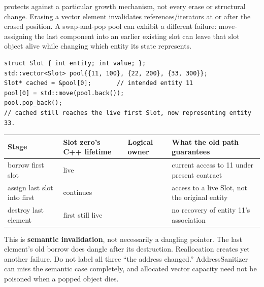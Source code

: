  protects against a particular growth mechanism, not every erase or structural change. Erasing a vector element invalidates references/iterators at or after the erased position. A swap-and-pop pool can exhibit a different failure: move-assigning the last component into an earlier existing slot can leave that slot object alive while changing which entity its state represents.

\begin{verbatim}
struct Slot { int entity; int value; };
std::vector<Slot> pool{{11, 100}, {22, 200}, {33, 300}};
Slot* cached = &pool[0];       // intended entity 11
pool[0] = std::move(pool.back());
pool.pop_back();
// cached still reaches the live first Slot, now representing entity 33.
\end{verbatim}

{\def\LTcaptype{none} %
\begin{longtable}[]{@{}
  >{\raggedright\arraybackslash}p{}
  >{\raggedright\arraybackslash}p{}
  >{\raggedright\arraybackslash}p{}
  >{\raggedright\arraybackslash}p{}@{}}
\toprule\noalign{}
\begin{minipage}[b]{\linewidth}\raggedright
Stage
\end{minipage} & \begin{minipage}[b]{\linewidth}\raggedright
Slot zero's C++ lifetime
\end{minipage} & \begin{minipage}[b]{\linewidth}\raggedright
Logical owner
\end{minipage} & \begin{minipage}[b]{\linewidth}\raggedright
What the old path guarantees
\end{minipage} \\
\midrule\noalign{}
\endhead
\bottomrule\noalign{}
\endlastfoot
borrow first slot & live & 11 & current access to 11 under present contract \\
assign last slot into first & continues & 33 & access to a live Slot, not the original entity \\
destroy last element & first still live & 33 & no recovery of entity 11's association \\
\end{longtable}
}

This is \textbf{semantic invalidation}, not necessarily a dangling pointer. The last element's old borrow does dangle after its destruction. Reallocation creates yet another failure. Do not label all three ``the address changed.'' AddressSanitizer can miss the semantic case completely, and allocated vector capacity need not be poisoned when a popped object dies.

